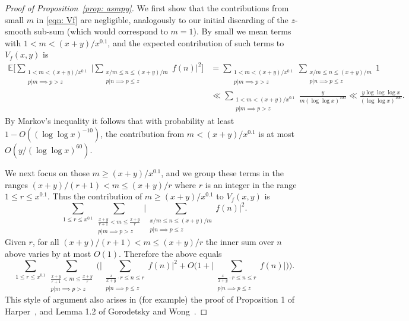 \documentclass[12pt, notitlepage]{amsart}
\numberwithin{equation}{section}
\def\E{\mathbb E}
\theoremstyle{remark}
\theoremstyle{definition}
\theoremstyle{remark}
\numberwithin{equation}{section}
\begin{document}
\begin{proof}[Proof of Proposition~\ref{prop: asmpy}]
We first show that the contributions from small $m$ in \eqref{eqn: Vf} are negligible, analogously to our initial discarding of the $z$-smooth sub-sum (which would correspond to $m=1$). By small we mean terms with $1< m < (x+y)/x^{0.1}$, and the expected contribution of such terms to $V_f(x,y)$ is  
\begin{align*}
\E\Big[ \sum_{ \substack{1<m < (x+y)/x^{0.1} \\ p|m \implies p>z}} \Big| \sum_{\substack{x/m\le n \le (x+y)/m \\ p|n \implies p\le z  }  } f(n) \Big|^{2} \Big] &= \sum_{ \substack{1<m < (x+y)/{x^{0.1}} \\ p|m \implies p>z}} \sum_{\substack{x/m\le n \le (x+y)/m \\ p|n \implies p\le z  }  } 1 \\ 
&\ll \sum_{ \substack{1<m < (x+y)/{x^{0.1}} \\ p|m \implies p>z}} \frac{y}{m  (\log \log x)^{100}} 
\ll \frac{y \log\log\log x}{(\log \log x)^{100}} .
\end{align*}
By Markov's inequality it follows that with probability at least $1-O({(\log \log x)^{-10}})$, the contribution from $m < (x+y)/x^{0.1}$ is at most $O(y/(\log \log x)^{60})$.

We next focus on those $m\ge (x+y)/x^{0.1}$, and we group these terms in the ranges $(x+y)/(r+1) < m \le (x+y)/r$ where $r$ is an integer in the range $1\le r\le x^{0.1}$.  Thus the contribution of $m \ge (x+y)/x^{0.1}$ to $V_f(x,y)$ is 
\begin{equation*}
 \sum_{1\le r \le x^{0.1}}     \sum_{ \substack{\frac{x+y}{r+1} < m \le  \frac{x+y}{r} \\ p|m \implies p>z}} \Big| \sum_{\substack{x/m\le n \le (x+y)/m \\ p|n \implies p\le z  }  } f(n) \Big|^{2}. 
\end{equation*}
Given $r$, for all $(x+y)/(r+1) < m \le (x+y)/r$ the inner sum over $n$ above varies by at most $O(1)$.   Therefore the above equals 
\begin{equation}\label{eqn: short}
 \sum_{1\le r \le x^{0.1}}     \sum_{ \substack{\frac{x+y}{r+1} < m \le \frac{x+y}{r} \\ p|m \implies p>z}} \Big(\Big| \sum_{\substack{ \frac{x}{x+y} \cdot r
\le n \le r \\ p|n \implies p\le z  }  } f(n) \Big|^{2} +O\Big(1 +\Big| \sum_{\substack{ \frac{x}{x+y} \cdot r
\le n \le r \\ p|n \implies p\le z  }  } f(n) \Big|\Big) \Big).
\end{equation}
This style of argument also arises in (for example) the proof of Proposition 1 of Harper~\cite{Harperlargevalue}, and Lemma 1.2 of Gorodetsky and Wong~\cite{GW-Short}. 


\end{proof}
\end{document}
